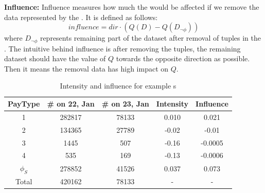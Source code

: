 \textbf{Influence:}
Influence measures how much the {\fact} would be affected if we remove the data represented by the {\explanation}. 
It is defined as follows:
$$influence = dir \cdot (Q (D) - Q(D_{\neg \phi})) $$
where $D_{\neg \phi}$ represents remaining part of the dataset after removal of tuples in the {\explanation}. The intuitive behind influence is after removing the {\explanation} tuples, the remaining dataset should have the value of $Q$ towards the opposite direction as possible. Then it means the removal data has high impact on $Q$. 

\begin{table}
	\centering
	\caption{Intensity and influence for example {\explanation}s}
	\begin{tabular}{|c|c|c|c|c|}
		\hline
		PayType & \# on 22, Jan & \# on 23, Jan & Intensity & Influence\\ \hline
		1 & 282817 & 78133 & 0.010& 0.021\\ \hline
		2 & 134365 & 27789  & -0.02& -0.01\\ \hline
		3 & 1445 & 507  & -0.16& -0.0005\\ \hline
		4 & 535 & 169  & -0.13& -0.0006\\ \hline
		$\phi_S$ & 278852 &  41526 & 0.037 & 0.073\\ \hline
		Total	& 420162 & 78133 &- & - \\ \hline			
	\end{tabular}
	\label{table:intensity_influence_example}
\end{table}

